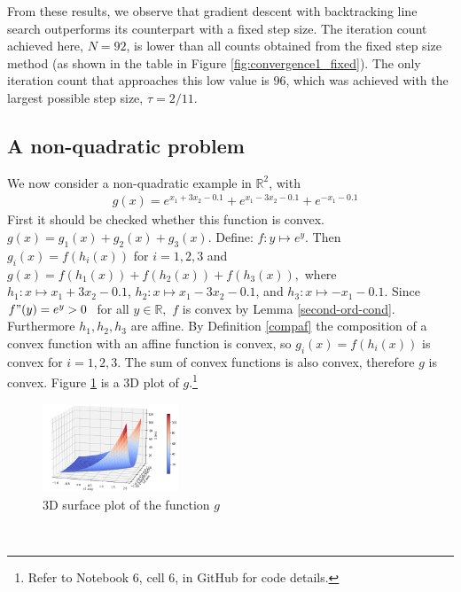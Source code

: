 From these results, we observe that gradient descent with backtracking line search outperforms its counterpart with a fixed step size. The iteration count achieved here, $N=92$, is lower than all counts obtained from the fixed step size method (as shown in the table in Figure \ref{fig:convergence1_fixed}). The only iteration count that approaches this low value is $96$, which was achieved with the largest possible step size, $\tau=2/11$.
\newpage
\subsection{A non-quadratic problem}
We now consider a non-quadratic example in $\mathbb{R}^2$,  with 
\begin{equation*}\label{eq:12}\tag{6.2.1}
\begin{aligned}  
    &g(x) = e^{x_{1}+3x_{2}-0.1}+e^{x_{1}-3x_{2}-0.1}+e^{-x_{1}-0.1}
\end{aligned}
\end{equation*}
First it should be checked whether this function is convex. $g(x) = g_{1}(x)  + g_{2}(x) + g_{3}(x).$ Define: $f: y \mapsto e^{y}$. Then $g_{i}(x) = f(h_{i}(x))$ for $i=1,2,3$ and $g(x) = f(h_{1}(x)) + f(h_{2}(x)) + f(h_{3}(x)),$ where $h_{1}: x \mapsto x_{1} + 3x_{2}-0.1$, $h_{2}: x \mapsto x_{1} - 3x_{2}-0.1$, and $h_{3}: x \mapsto -x_{1}-0.1$. Since $f"(y) = e^{y} > 0 \text{ }$ for all $y \in \mathbb{R},$ $f$ is convex by Lemma \ref{second-ord-cond}. Furthermore $h_{1}, h_{2}, h_{3}$ are affine. By Definition \ref{compaf} the composition of a convex function with an affine function is convex, so $g_{i}(x) = f(h_{i}(x))$ is convex for $i=1,2,3.$ The sum of convex functions is also convex, therefore $g$ is convex. Figure \ref{fig:exp} is a 3D plot of $g.$\footnote{Refer to Notebook 6, cell 6, in GitHub \cite{ThesisCode2023} for code details.}
\begin{figure}[h!]
    \centering
        \includegraphics[width=0.36\textwidth]{Pictures/3D plot of an exponential function.png}
    \caption{3D surface plot of the function $g$}\label{fig:exp}
\end{figure}\\
